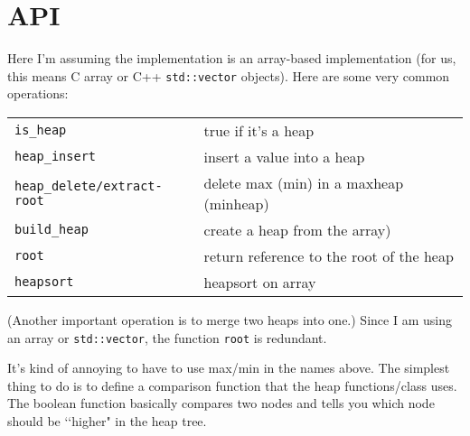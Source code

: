 %
%

\section{API}

Here I'm assuming the implementation is an array-based implementation
(for us, this means C array or C++ \verb!std::vector! objects).
Here are some very common operations:

\begin{longtable}{l|l}
\hline
\texttt{is\_heap}                   & true if it's a heap \\
\texttt{heap\_insert}               & insert a value into a heap \\
\texttt{heap\_delete/extract-root}  & delete max (min) in a maxheap (minheap) \\
\texttt{build\_heap}           & create a heap from the array) \\
\texttt{root}                  & return reference to the root of the heap \\
\texttt{heapsort}              & heapsort on array \\
\hline
\end{longtable}
(Another important operation is to merge two heaps into one.)
Since I am using an array or \verb!std::vector!, the function \verb!root!
is redundant.

It's kind of annoying to have to use max/min in the names above.
The simplest thing to do is to define a comparison function that the
heap functions/class uses.
The boolean function basically compares two nodes and tells you
which node should be \lq\lq higher" in the heap tree.
